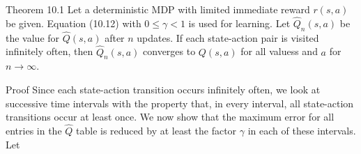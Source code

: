 \documentclass[10pt]{article}
\begin{document}
\begin{displayquote}
Theorem 10.1 Let a deterministic MDP with limited immediate reward $r(s, a)$ be given. Equation (10.12) with $0 \leq \gamma<1$ is used for learning. Let $\hat{Q}_{n}(s, a)$ be the value for $\hat{Q}(s, a)$ after $n$ updates. If each state-action pair is visited infinitely often, then $\hat{Q}_{n}(s, a)$ converges to $Q(s, a)$ for all valuess and $a$ for $n \rightarrow \infty$.
\end{displayquote}

Proof Since each state-action transition occurs infinitely often, we look at successive time intervals with the property that, in every interval, all state-action transitions occur at least once. We now show that the maximum error for all entries in the $\hat{Q}$ table is reduced by at least the factor $\gamma$ in each of these intervals. Let
\end{document}
